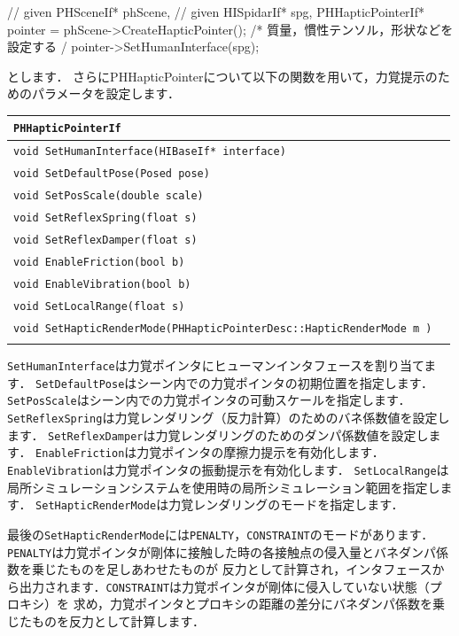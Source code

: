 \begin{sourcecode}
	// given PHSceneIf* phScene,
	// given HISpidarIf* spg,
    PHHapticPointerIf* pointer = phScene->CreateHapticPointer();
    /*
\KLUDGE         質量，慣性テンソル，形状などを設定する
\KLUDGE     */
    pointer->SetHumanInterface(spg);
\end{sourcecode}
\KLUDGE とします．
\KLUDGE さらにPHHapticPointerについて以下の関数を用いて，力覚提示のためのパラメータを設定します．

\noindent
\begin{tabular}{p{.8\hsize}p{.1\hsize}}
\\
\texttt{PHHapticPointerIf}													\\ \midrule
\texttt{void SetHumanInterface(HIBaseIf* interface)}						&	\\
\texttt{void SetDefaultPose(Posed pose)}									&	\\
\texttt{void SetPosScale(double scale)}										&	\\
\texttt{void SetReflexSpring(float s)}										&	\\
\texttt{void SetReflexDamper(float s)}										&	\\
\texttt{void EnableFriction(bool b)}										&	\\
\texttt{void EnableVibration(bool b)}										&	\\
\texttt{void SetLocalRange(float s)}										&	\\
\texttt{void SetHapticRenderMode(PHHapticPointerDesc::HapticRenderMode m )}	&	\\
\\
\end{tabular}

\texttt{SetHumanInterface}は力覚ポインタにヒューマンインタフェースを割り当てます．
\texttt{SetDefaultPose}はシーン内での力覚ポインタの初期位置を指定します．
\texttt{SetPosScale}はシーン内での力覚ポインタの可動スケールを指定します．
\texttt{SetReflexSpring}は力覚レンダリング（反力計算）のためのバネ係数値を設定します．
\texttt{SetReflexDamper}は力覚レンダリングのためのダンパ係数値を設定します．
\texttt{EnableFriction}は力覚ポインタの摩擦力提示を有効化します．
\texttt{EnableVibration}は力覚ポインタの振動提示を有効化します．
\texttt{SetLocalRange}は局所シミュレーションシステムを使用時の局所シミュレーション範囲を指定します．
\texttt{SetHapticRenderMode}は力覚レンダリングのモードを指定します．

\KLUDGE 最後の\texttt{SetHapticRenderMode}には\texttt{PENALTY}，\texttt{CONSTRAINT}のモードがあります．
\texttt{PENALTY}は力覚ポインタが剛体に接触した時の各接触点の侵入量とバネダンパ係数を乗じたものを足しあわせたものが
\KLUDGE 反力として計算され，インタフェースから出力されます．\texttt{CONSTRAINT}は力覚ポインタが剛体に侵入していない状態（プロキシ）を
\KLUDGE 求め，力覚ポインタとプロキシの距離の差分にバネダンパ係数を乗じたものを反力として計算します．
